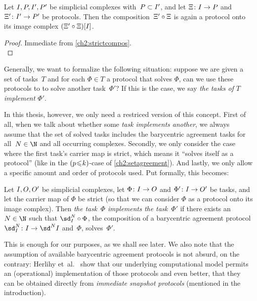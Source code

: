 \begin{thCorollary}
    Let $\cI,\cP,\cI',\cP'$ be simplicial complexes with~$\cP\subset\cI'$,
    and let $\Xi\colon\cI\to\cP$ and $\Xi'\colon\cI'\to\cP'$ be protocols.
    Then the composition~$\Xi'\after\Xi$ is again
    a protocol onto its image complex $(\Xi'\after\Xi)[\cI]$.
\end{thCorollary}

\begin{proof}
    Immediate from \cref{ch2:strictcompos}.
    \\
\end{proof}

Generally, we want to formalize the following situation: suppose we are
given a set of tasks~$T$ and for each $\Phi\in T$ a protocol that
solves $\Phi$, can we use these protocols to to solve another task~$\Phi'$? If
this is the case, we say \emph{the tasks of $T$ implement $\Phi'$}.

In this thesis, however, we only need a restriced version of this concept.
First of all, when we talk about whether some \emph{task implements another},
we always assume that the set of solved tasks includes the barycentric agreement
tasks  for all~$N\in\N$ and all occurring
complexes. Secondly, we only consider the case where the first task's carrier map
is strict, which means it \enquote{solves itself as a protocol} (like in the
$(p\mkern1mu{\leq}\mkern1muk)$-case of \cref{ch2:setagreement}). And lastly, we
only allow a specific amount and order of protocols used. Put formally, this
becomes:

\begin{thDef}
    Let $\cI,\cO,\cO'$ be simplicial complexes, let
    $\Phi\colon\cI\to\cO$ and $\Phi'\colon\cI\to\cO'$ be tasks, and
    let the carrier map of $\Phi$ be strict (so that we can consider $\Phi$ as a
    protocol onto its image complex). Then \emph{the task~$\Phi$ implements the
    task~$\Phi'$} if there exists an $N\in\N$ such that $\sd_{\cI}^N\after\Phi$,
    the composition of a barycentric agreement protocol
    $\sd_{\cI}^N\colon\cI\to\sd^N\cI$ and~$\Phi$, solves~$\Phi'$.
\end{thDef}

This is enough for our purposes, as we shall see later. We also note that the
assumption of available barycentric agreement protocols is not absurd, on
the contrary: Herlihy et~al.~\cite[Corollary 4.2.10]{bookc:herlihyetal13} show
that our underlying computational model permits an (operational) implementation
of those protocols and even better, that they can be obtained directly from 
\emph{immediate snapshot protocols} (mentioned in the introduction).
